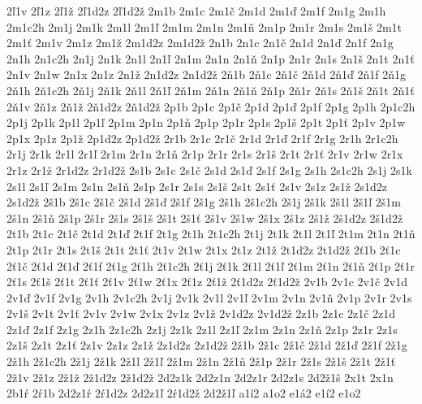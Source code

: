 {2\v l1v
2\v l1z
2\v l1\v z
2\v l1d2z
2\v l1d2\v z
2m1b
2m1c
2m1\v c
2m1d
2m1\v d
2m1f
2m1g
2m1h
2m1c2h
2m1j
2m1k
2m1l
2m1\v l
2m1m
2m1n
2m1\v n
2m1p
2m1r
2m1s
2m1\v s
2m1t
2m1\v t
2m1v
2m1z
2m1\v z
2m1d2z
2m1d2\v z
2n1b
2n1c
2n1\v c
2n1d
2n1\v d
2n1f
2n1g
2n1h
2n1c2h
2n1j
2n1k
2n1l
2n1\v l
2n1m
2n1n
2n1\v n
2n1p
2n1r
2n1s
2n1\v s
2n1t
2n1\v t
2n1v
2n1w
2n1x
2n1z
2n1\v z
2n1d2z
2n1d2\v z
2\v n1b
2\v n1c
2\v n1\v c
2\v n1d
2\v n1\v d
2\v n1f
2\v n1g
2\v n1h
2\v n1c2h
2\v n1j
2\v n1k
2\v n1l
2\v n1\v l
2\v n1m
2\v n1n
2\v n1\v n
2\v n1p
2\v n1r
2\v n1s
2\v n1\v s
2\v n1t
2\v n1\v t
2\v n1v
2\v n1z
2\v n1\v z
2\v n1d2z
2\v n1d2\v z
2p1b
2p1c
2p1\v c
2p1d
2p1\v d
2p1f
2p1g
2p1h
2p1c2h
2p1j
2p1k
2p1l
2p1\v l
2p1m
2p1n
2p1\v n
2p1p
2p1r
2p1s
2p1\v s
2p1t
2p1\v t
2p1v
2p1w
2p1x
2p1z
2p1\v z
2p1d2z
2p1d2\v z
2r1b
2r1c
2r1\v c
2r1d
2r1\v d
2r1f
2r1g
2r1h
2r1c2h
2r1j
2r1k
2r1l
2r1\v l
2r1m
2r1n
2r1\v n
2r1p
2r1r
2r1s
2r1\v s
2r1t
2r1\v t
2r1v
2r1w
2r1x
2r1z
2r1\v z
2r1d2z
2r1d2\v z
2s1b
2s1c
2s1\v c
2s1d
2s1\v d
2s1f
2s1g
2s1h
2s1c2h
2s1j
2s1k
2s1l
2s1\v l
2s1m
2s1n
2s1\v n
2s1p
2s1r
2s1s
2s1\v s
2s1t
2s1\v t
2s1v
2s1z
2s1\v z
2s1d2z
2s1d2\v z
2\v s1b
2\v s1c
2\v s1\v c
2\v s1d
2\v s1\v d
2\v s1f
2\v s1g
2\v s1h
2\v s1c2h
2\v s1j
2\v s1k
2\v s1l
2\v s1\v l
2\v s1m
2\v s1n
2\v s1\v n
2\v s1p
2\v s1r
2\v s1s
2\v s1\v s
2\v s1t
2\v s1\v t
2\v s1v
2\v s1w
2\v s1x
2\v s1z
2\v s1\v z
2\v s1d2z
2\v s1d2\v z
2t1b
2t1c
2t1\v c
2t1d
2t1\v d
2t1f
2t1g
2t1h
2t1c2h
2t1j
2t1k
2t1l
2t1\v l
2t1m
2t1n
2t1\v n
2t1p
2t1r
2t1s
2t1\v s
2t1t
2t1\v t
2t1v
2t1w
2t1x
2t1z
2t1\v z
2t1d2z
2t1d2\v z
2\v t1b
2\v t1c
2\v t1\v c
2\v t1d
2\v t1\v d
2\v t1f
2\v t1g
2\v t1h
2\v t1c2h
2\v t1j
2\v t1k
2\v t1l
2\v t1\v l
2\v t1m
2\v t1n
2\v t1\v n
2\v t1p
2\v t1r
2\v t1s
2\v t1\v s
2\v t1t
2\v t1\v t
2\v t1v
2\v t1w
2\v t1x
2\v t1z
2\v t1\v z
2\v t1d2z
2\v t1d2\v z
2v1b
2v1c
2v1\v c
2v1d
2v1\v d
2v1f
2v1g
2v1h
2v1c2h
2v1j
2v1k
2v1l
2v1\v l
2v1m
2v1n
2v1\v n
2v1p
2v1r
2v1s
2v1\v s
2v1t
2v1\v t
2v1v
2v1w
2v1x
2v1z
2v1\v z
2v1d2z
2v1d2\v z
2z1b
2z1c
2z1\v c
2z1d
2z1\v d
2z1f
2z1g
2z1h
2z1c2h
2z1j
2z1k
2z1l
2z1\v l
2z1m
2z1n
2z1\v n
2z1p
2z1r
2z1s
2z1\v s
2z1t
2z1\v t
2z1v
2z1z
2z1\v z
2z1d2z
2z1d2\v z
2\v z1b
2\v z1c
2\v z1\v c
2\v z1d
2\v z1\v d
2\v z1f
2\v z1g
2\v z1h
2\v z1c2h
2\v z1j
2\v z1k
2\v z1l
2\v z1\v l
2\v z1m
2\v z1n
2\v z1\v n
2\v z1p
2\v z1r
2\v z1s
2\v z1\v s
2\v z1t
2\v z1\v t
2\v z1v
2\v z1z
2\v z1\v z
2\v z1d2z
2\v z1d2\v z
2d2z1k
2d2z1n
2d2z1r
2d2z1s
2d2\v z1\v s
2x1t
2x1n
2b1\'r
2\'r1b
2d2z1\'r
2\'r1d2z
2d2z1\v l
2\'r1d2\v z
2d2\v z1\v l
a1\'i2
a1o2
e1\'a2
e1\'i2
e1o2
}
